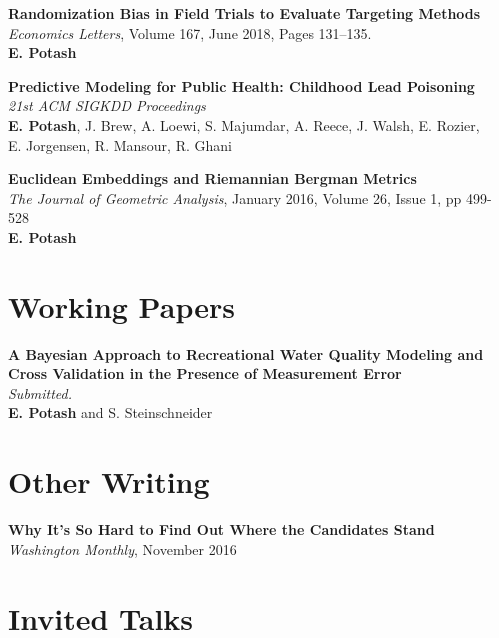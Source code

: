 \documentclass[margin,line]{resume}
\begin{document}
\begin{resume}
        {\bf Randomization Bias in Field Trials to Evaluate Targeting Methods}\\
        \textit{Economics Letters}, Volume 167, June 2018, Pages 131--135.\\
        \textbf{E. Potash}

	{\bf Predictive Modeling for Public Health: Childhood Lead Poisoning} \\
        \textit{21st ACM SIGKDD Proceedings} \\
        \textbf{E. Potash}, J. Brew, A. Loewi, S. Majumdar, A. Reece, J. Walsh, E. Rozier,\\ E. Jorgensen, R. Mansour, R. Ghani

	{\bf Euclidean Embeddings and Riemannian Bergman Metrics} \\
        \textit{The Journal of Geometric Analysis}, January 2016, Volume 26, Issue 1, pp 499-528\\
        \textbf{E. Potash}

        \section{\mysidestyle Working Papers}
        
        {\bf A Bayesian Approach to Recreational Water Quality Modeling and \\ Cross Validation in the Presence of Measurement Error}\\
        \textit{Submitted.}\\
        \textbf{E. Potash} and S. Steinschneider

        \section{\mysidestyle Other Writing}
        {\bf Why It's So Hard to Find Out Where the Candidates Stand} \\
        \textit{Washington Monthly}, November 2016

	\section{\mysidestyle Invited Talks}
        

\end{resume}
\end{document}
